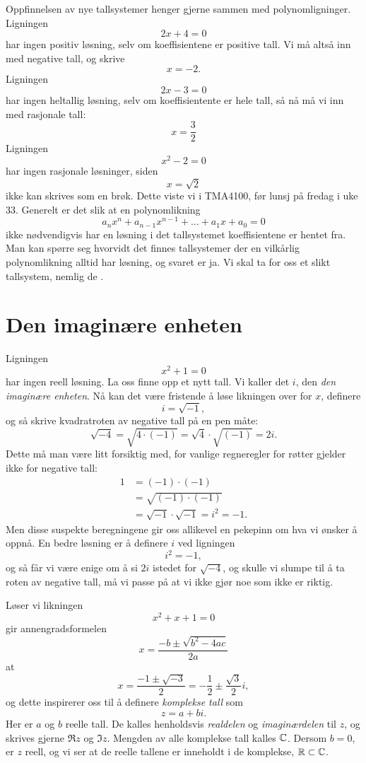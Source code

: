 

\label{ch:komplekse-tall}


Oppfinnelsen av nye tallsystemer henger gjerne sammen med polynomligninger. Ligningen 
\[
2x+4=0
\]
har ingen positiv løsning, selv om koeffisientene er positive tall. 
Vi må altså inn med negative tall, og skrive 
\[
x=-2.
\]
Ligningen
\[
2x-3=0
\]
har ingen heltallig løsning, selv om koeffisientente er hele tall, så nå må vi inn med rasjonale tall:
\[
x=\frac{3}{2}
\]
Ligningen
\[
x^2-2=0
\]
har ingen rasjonale løsninger, siden
\[
x=\sqrt{2}
\]
ikke kan skrives som en brøk. Dette viste vi i TMA4100, før lunsj på fredag i uke 33. 
Generelt er det slik at en polynomlikning
\[
a_nx^n+a_{n-1}x^{n-1}+...+a_1x+a_0=0
\]
ikke nødvendigvis har en løsning i det tallsystemet koeffisientene er hentet fra. 
Man kan spørre seg hvorvidt det finnes tallsystemer der en vilkårlig polynomlikning alltid har løsning, 
og svaret er ja. 
Vi skal ta for oss et slikt tallsystem, nemlig de .


\section*{Den imaginære enheten}
Ligningen
\[
x^2+1=0
\]
har ingen reell løsning. 
La oss finne opp et nytt tall. Vi kaller det $i$, den \emph{den imaginære enheten}. 
Nå kan det være fristende å løse likningen over for $x$, definere
\[
i=\sqrt{-1},
\]
og så skrive kvadratroten av negative tall på en pen måte:
\begin{equation*}
\sqrt{-4}=\sqrt{4\cdot (-1)}=\sqrt{4}\cdot \sqrt{(-1)}=2i.
\end{equation*}
Dette må man være litt forsiktig med, 
for vanlige regneregler for røtter gjelder ikke for negative tall:
\begin{align*}
1&=(-1)\cdot(-1)\\&=\sqrt{(-1)\cdot (-1)}\\&=\sqrt{-1}\cdot \sqrt{ -1}=i^2=-1.
\end{align*}
Men disse suspekte beregningene gir oss allikevel en pekepinn om hva vi ønsker å oppnå. 
En bedre løsning er å definere $i$ ved ligningen
\[
i^2=-1,
\]
og så får vi være enige om å si $2i$ istedet for $\sqrt{-4}$, 
og skulle vi slumpe til å ta roten av negative tall, 
må vi passe på at vi ikke gjør noe som ikke er riktig.

Løser vi likningen
\[
x^2+x+1=0
\]
gir annengradsformelen
\[
x=\frac{-b\pm\sqrt{b^2-4ac}}{2a}
\]
at
\[
x=\frac{-1\pm\sqrt{-3}}{2}=-\frac{1}{2}\pm\frac{\sqrt{3}}{2}i,
\]
og dette inspirerer oss til å definere \emph{komplekse tall} som 
\[
z=a+bi.
\]
Her er $a$ og $b$ reelle tall. 
De kalles henholdsvis \emph{realdelen} og \emph{imaginærdelen} til $z$,
og skrives gjerne $\Re z$ og $\Im z$. 
Mengden av alle komplekse tall kalles $\mathbb{C}$. 
Dersom $b=0$, er $z$ reell, og vi ser at de reelle tallene er inneholdt i de komplekse, $\mathbb{R} \subset \mathbb{C}$.


